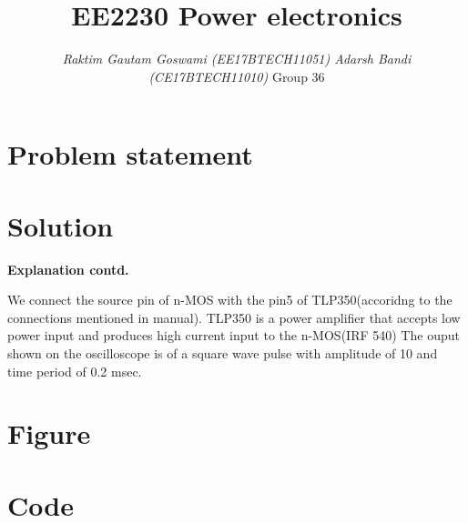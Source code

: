\documentclass[xcolor = dvipsnames]{beamer}
\begin{document}
\title{\textbf{EE2230 Power electronics}}   
\author{\textit{Raktim Gautam Goswami (EE17BTECH11051) \newline Adarsh Bandi (CE17BTECH11010)}
\linebreak 
\linebreak Group 36}

\frame{\titlepage} 



\section{Problem statement } 


\section{Solution}

\begin{frame}
\textbf{Explanation contd.}
\linebreak
\linebreak
\begin{flushleft}
We connect the source pin of n-MOS with the pin5 of TLP350(accoridng to the connections mentioned in manual).
\linebreak
\linebreak
\textbf{}TLP350 is a power amplifier that accepts low power input and produces high current input to the n-MOS(IRF 540)
\linebreak
\linebreak
\textbf{}The ouput shown on the oscilloscope is of a square  wave pulse with amplitude of 10 and time period of 0.2 msec.

\end{flushleft}
\end{frame}



\section{Figure}

\section{Code}
\end{document}
